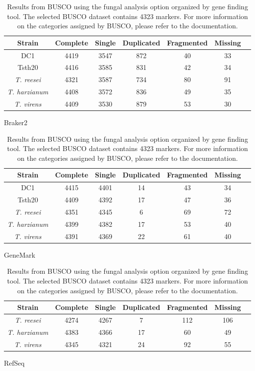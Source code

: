 \begin{table}
  \begin{center}
    \begin{subtable}{\textwidth}
      \centering
      \begin{tabular}{|c|c|c|c|c|c|c|}
        \hline
        Strain & Complete & Single & Duplicated & Fragmented & Missing \\ \hline
        DC1 & 4419 & 3547 & 872 & 40 & 33 \\ \hline
        Tsth20 & 4416 & 3585 & 831 & 42 & 34 \\ \hline
        \textit{T. reesei} & 4321 & 3587 & 734 & 80 & 91 \\ \hline
        \textit{T. harzianum} & 4408 & 3572 & 836 & 49 & 35 \\ \hline
        \textit{T. virens} & 4409 & 3530 & 879 & 53 & 30 \\ \hline
      \end{tabular}
      \caption{Braker2}
      \vspace{0.5cm}
    \end{subtable}
    \begin{subtable}{\textwidth}
      \centering
      \begin{tabular}{|c|c|c|c|c|c|c|}
        \hline
        Strain & Complete & Single & Duplicated & Fragmented & Missing \\ \hline
        DC1 & 4415 & 4401 & 14 & 43 & 34 \\ \hline
        Tsth20 & 4409 & 4392 & 17 & 47 & 36 \\ \hline
        \textit{T. reesei} & 4351 & 4345 & 6 & 69 & 72 \\ \hline
        \textit{T. harzianum} & 4399 & 4382 & 17 & 53 & 40 \\ \hline
        \textit{T. virens} & 4391 & 4369 & 22 & 61 & 40 \\ \hline
      \end{tabular}
      \caption{GeneMark}
      \vspace{0.5cm}
    \end{subtable}
    \begin{subtable}{\textwidth}
      \centering
      \begin{tabular}{|c|c|c|c|c|c|c|}
        \hline
        Strain & Complete & Single & Duplicated & Fragmented & Missing \\ \hline
        \textit{T. reesei} & 4274 & 4267 & 7 & 112 & 106 \\ \hline
        \textit{T. harzianum} & 4383 & 4366 & 17 & 60 & 49 \\ \hline
        \textit{T. virens} & 4345 & 4321 & 24 & 92 & 55 \\ \hline  
      \end{tabular}
      \caption{RefSeq}
    \end{subtable}
  \end{center}
  \caption{Results from BUSCO using the fungal analysis option
    organized by gene finding tool. The selected BUSCO dataset
    contains 4323 markers. For more information on the categories
    assigned by BUSCO, please refer to the documentation.}
  \label{table:busco}
\end{table}

